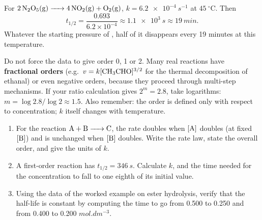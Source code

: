 \documentclass[11pt]{article}
\begin{document}
\begin{exemplebox}
For $\ce{2N2O5(g) -> 4NO2(g) + O2(g)}$, $k = \SI{6.2e-4}{s^{-1}}$ at $\SI{45}{\ensuremath{{}^{\circ}\mathrm{C}}}$. Then
\[
t_{1/2} = \frac{0.693}{6.2\times10^{-4}} \approx \SI{1.1e3}{s} \approx \SI{19}{min}.
\]
Whatever the starting pressure of , half of it disappears every 19 minutes at this temperature.
\end{exemplebox}

\begin{attention}
Do not force the data to give order 0, 1 or 2. Many real reactions have \textbf{fractional orders} (e.g.\ $v = k[\ce{CH3CHO}]^{3/2}$ for the thermal decomposition of ethanal) or even negative orders, because they proceed through multi-step mechanisms. If your ratio calculation gives $2^m = 2.8$, take logarithms: $m = \log 2.8 / \log 2 \approx 1.5$. Also remember: the order is defined only with respect to concentration; $k$ itself changes with temperature.
\end{attention}

\begin{exercice}
\begin{enumerate}
\item For the reaction $\ce{A + B -> C}$, the rate doubles when $[\ce{A}]$ doubles (at fixed $[\ce{B}]$) and is unchanged when $[\ce{B}]$ doubles. Write the rate law, state the overall order, and give the units of $k$.
\item A first-order reaction has $t_{1/2} = \SI{346}{s}$. Calculate $k$, and the time needed for the concentration to fall to one eighth of its initial value.
\item Using the data of the worked example on ester hydrolysis, verify that the half-life is constant by computing the time to go from 0.500 to 0.250 and from 0.400 to 0.200 $\si{mol.dm^{-3}}$.
\end{enumerate}
\end{exercice}
\end{document}
